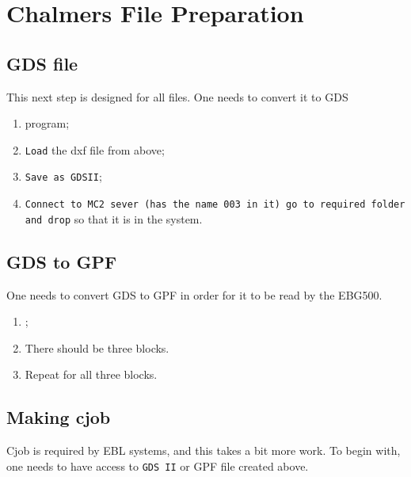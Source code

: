 
\section{Chalmers File Preparation}

  \subsection{GDS file}
   This next step is designed for all files. One needs to convert it to GDS
   
   \begin{enumerate}
   	\item {} \textbf{} program;
   	\item \texttt{Load} the dxf file from above;
   	\item \texttt{Save as GDSII};
   	\item \texttt{Connect to MC2 sever (has the name 003 in it) \ira go to required folder and drop} so that it is in the system.
   \end{enumerate}

  \subsection{GDS to GPF}
   One needs to convert GDS to GPF in order for it to be read by the EBG500.
   \begin{enumerate}
   	\item {};
   	\item There should be three blocks. 
   	\item Repeat for all three blocks.
   \end{enumerate}
  
  \subsection{Making cjob}
   Cjob is required by EBL systems, and this takes a bit more work. To begin with, one needs to have access to \texttt{GDS II} or GPF file created above.
   
